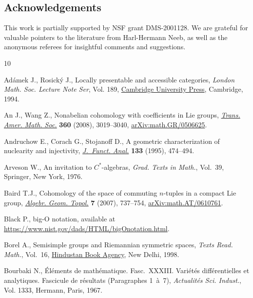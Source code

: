 \documentclass[pdftex]{sigma}
\numberwithin{equation}{section}
\begin{document}
\subsection*{Acknowledgements}

This work is partially supported by NSF grant DMS-2001128.
We are grateful for valuable pointers to the literature from Harl-Hermann Neeb, as well as the anonymous referees for insightful comments and suggestions.

\begin{thebibliography}{10}
\footnotesize\itemsep=0pt

Ad\'amek J., Rosick\'y J., Locally presentable and accessible categories,
 \textit{London Math. Soc. Lecture Note Ser}, Vol. 189, \href{https://doi.org/10.1017/CBO9780511600579}{Cambridge University
 Press}, Cambridge, 1994.

An J., Wang Z., Nonabelian cohomology with coefficients in {L}ie groups,
 \href{https://doi.org/10.1090/S0002-9947-08-04278-5}{\textit{Trans. Amer. Math. Soc.}} \textbf{360} (2008), 3019--3040,
 \href{https://arxiv.org/abs/math.GR/0506625}{arXiv:math.GR/0506625}.

Andruchow E., Corach G., Stojanoff D., A geometric characterization of
 nuclearity and injectivity, \href{https://doi.org/10.1006/jfan.1995.1134}{\textit{J.~Funct. Anal.}} \textbf{133} (1995),
 474--494.

Arveson W., An invitation to {$C^*$}-algebras, \textit{Grad. Texts in Math.},
 Vol.~39, Springer, New York, 1976.

Baird T.J., Cohomology of the space of commuting {$n$}-tuples in a compact
 {L}ie group, \href{https://doi.org/10.2140/agt.2007.7.737}{\textit{Algebr. Geom. Topol.}} \textbf{7} (2007), 737--754,
 \href{https://arxiv.org/abs/math.AT/0610761}{arXiv:math.AT/0610761}.

Black P., big-{O} notation, available at
 \url{https://www.nist.gov/dads/HTML/bigOnotation.html}.

Borel A., Semisimple groups and {R}iemannian symmetric spaces, \textit{Texts
 Read. Math.}, Vol.~16, \href{https://doi.org/10.1007/978-93-80250-92-2}{Hindustan Book Agency}, New Delhi, 1998.

Bourbaki N., \'El\'ements de math\'ematique. {F}asc.~{XXXIII}. {V}ari\'et\'es
 diff\'erentielles et analytiques. {F}ascicule de r\'esultats ({P}aragraphes
 1~\`a~7), \textit{Actualit\'es Sci. Indust.}, Vol. 1333, Hermann, Paris,
 1967.


\end{thebibliography}
\end{document}
